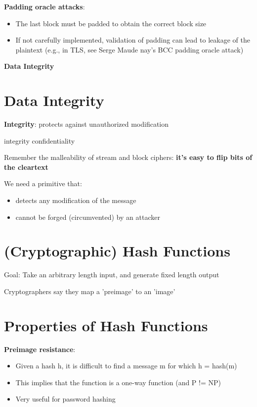 \documentclass[11pt]{article}
\begin{document}
\textbf{Padding oracle attacks}:
\begin{itemize}
	\item The last block must be padded to obtain the correct block size
	\item If not carefully implemented, validation of padding can lead to leakage of the plaintext (e.g., in TLS, see Serge Maude nay's BCC padding oracle attack)
\end{itemize}

\newpage

\begin{center}
  {\LARGE \textbf{Data Integrity}}
\end{center}

\vspace{1cm}

\section*{Data Integrity}

\textbf{Integrity}: protects against unauthorized modification

integrity \neq confidentiality

Remember the malleability of stream and block ciphers: \textbf{it's easy to flip bits of the cleartext}

We need a primitive that: 

\begin{itemize}
	\item detects any modification of the message
	\item cannot be forged (circumvented) by an attacker
\end{itemize}

\section*{(Cryptographic) Hash Functions}

Goal: Take an arbitrary length input, and generate fixed length output

Cryptographers say they map a 'preimage' to an 'image' 

\section*{Properties of Hash Functions}

\textbf{Preimage resistance}:

\begin{itemize}
	\item Given a hash h, it is difficult to find a message m for which h = hash(m)
	\item This implies that the function is a one-way function (and P != NP) 
	\item Very useful for password hashing
\end{itemize}
\end{document}

